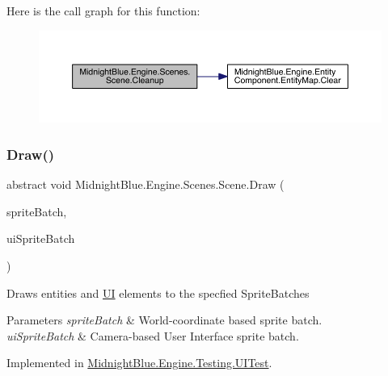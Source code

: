 Here is the call graph for this function\+:
\nopagebreak
\begin{figure}[H]
\begin{center}
\leavevmode
\includegraphics[width=350pt]{class_midnight_blue_1_1_engine_1_1_scenes_1_1_scene_a7200727dfc8a3c8b0d0b9cf54f920c92_cgraph}
\end{center}
\end{figure}
\hypertarget{class_midnight_blue_1_1_engine_1_1_scenes_1_1_scene_a6ec0b4be6c7dc226c9afd308e1fb3fd3}{}\label{class_midnight_blue_1_1_engine_1_1_scenes_1_1_scene_a6ec0b4be6c7dc226c9afd308e1fb3fd3} 
\subsubsection{\texorpdfstring{Draw()}{Draw()}}
{\footnotesize\ttfamily abstract void Midnight\+Blue.\+Engine.\+Scenes.\+Scene.\+Draw (\begin{DoxyParamCaption}\item[{Sprite\+Batch}]{sprite\+Batch,  }\item[{Sprite\+Batch}]{ui\+Sprite\+Batch }\end{DoxyParamCaption})\hspace{0.3cm}{\ttfamily [pure virtual]}}



Draws entities and \hyperlink{namespace_midnight_blue_1_1_engine_1_1_u_i}{UI} elements to the specfied Sprite\+Batches 


\begin{DoxyParams}{Parameters}
{\em sprite\+Batch} & World-\/coordinate based sprite batch.\\
\hline
{\em ui\+Sprite\+Batch} & Camera-\/based User Interface sprite batch.\\
\hline
\end{DoxyParams}


Implemented in \hyperlink{class_midnight_blue_1_1_engine_1_1_testing_1_1_u_i_test_a8c8604e47a7ac4ef8b8c74e82ff5cb83}{Midnight\+Blue.\+Engine.\+Testing.\+U\+I\+Test}.

